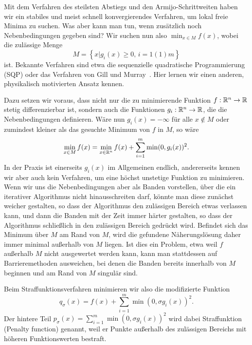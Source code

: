 Mit dem Verfahren des steilsten Abstiegs und den Armijo-Schrittweiten
haben wir ein stabiles und meist schnell konvergierendes Verfahren, um
lokal freie Minima zu suchen. Was aber kann man tun, wenn zusätzlich
noch Nebenbedingungen gegeben sind? Wir suchen nun also $\min_{x\in M}
f(x)$, wobei die zulässige Menge
\begin{equation}
  M=\left\{ x | g_i(x)\ge 0,\,i=1(1)m \right\}
\end{equation}
ist. Bekannte Verfahren sind etwa die sequenzielle quadratische
Programmierung (SQP) oder das Verfahren von Gill und
Murray~\cite{gill78a}. Hier lernen wir einen anderen, physikalisch
motivierten Ansatz kennen.

Dazu setzen wir voraus, dass nicht nur die zu minimierende Funktion
$f:\mathbb{R}^n\to\mathbb{R}$ stetig differenzierbar ist, sondern auch die
Funktionen $g_i:\mathbb{R}^n\to\mathbb{R}$, die die Nebenbedingungen
definieren. Wäre nun $g_i(x)=-\infty$ für alle $x\notin M$ oder
zumindest kleiner als das gesuchte Minimum von $f$ in $M$, so wäre
\begin{equation}
  \min_{x\in M} f(x) = \min_{x\in\mathbb{R}^n} f(x) + \sum_{i=1}^m \min(0,
  g_i(x))^2.
\end{equation}
In der Praxis ist einerseits $g_i(x)$ im Allgemeinen endlich,
andererseits kennen wir aber auch kein Verfahren, um eine höchst
unstetige Funktion zu minimieren. Wenn wir uns die Nebenbedingungen
aber als Banden vorstellen, über die ein iterativer Algorithmus nicht
hinausschreiten darf, könnte man diese zunächst weicher gestalten, so
dass der Algorithmus den zulässigen Bereich etwas verlassen kann, und
dann die Banden mit der Zeit immer härter gestalten, so dass der
Algorithmus schließlich in den zulässigen Bereich gedrückt
wird. Befindet sich das Minimum über $M$ am Rand von $M$, wird die
gefundene Näherungslösung daher immer minimal außerhalb von $M$
liegen. Ist dies ein Problem, etwa weil $f$ außerhalb $M$ nicht
ausgewertet werden kann, kann man stattdessen auf Barrieremethoden
ausweichen, bei denen die Banden bereits innerhalb von $M$ beginnen
und am Rand von $M$ singulär sind.

Beim Straffunktionsverfahren minimieren wir also die modifizierte
Funktion
\begin{equation}
  \label{eq:penalty}
  q_{\sigma}(x) = f(x) + \sum_{i=1}^m \min(0,
  \sigma g_i(x))^2.
\end{equation}
Der hintere Teil $p_{\sigma}(x) = \sum_{i=1}^m \min(0, \sigma
g_i(x))^2$ wird dabei Straffunktion (Penalty function)
genannt, weil er Punkte außerhalb des zulässigen Bereichs mit höheren
Funktionswerten bestraft.

